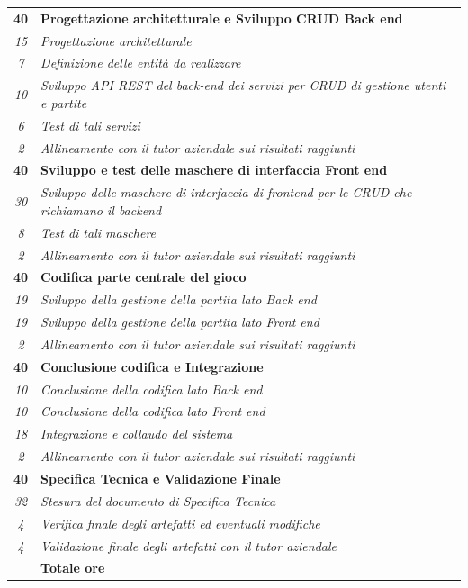 \begin{longtable}{|c|p{}|}
    \textbf{40} & \textbf{Progettazione architetturale e Sviluppo CRUD Back end} \\ \hdashline 
    \textit{15} & 
    \textit{Progettazione architetturale} \\
    \textit{7} & 
    \textit{Definizione delle entità da realizzare} \\
    \textit{10} & 
    \textit{Sviluppo API REST del back-end dei servizi per CRUD di gestione utenti e partite} \\
    \textit{6} & 
    \textit{Test di tali servizi} \\
    \textit{2} & 
    \textit{Allineamento con il tutor aziendale sui risultati raggiunti} \\
    \hline

    \textbf{40} & \textbf{Sviluppo e test delle maschere di interfaccia Front end} \\ \hdashline 
    \textit{30} & 
    \textit{Sviluppo delle maschere di interfaccia di frontend per le CRUD che richiamano il backend} \\
    \textit{8} & 
    \textit{Test di tali maschere} \\
    \textit{2} & 
    \textit{Allineamento con il tutor aziendale sui risultati raggiunti} \\
    \hline

    \textbf{40} & \textbf{Codifica parte centrale del gioco} \\ \hdashline 
    \textit{19} & 
    \textit{Sviluppo della gestione della partita lato Back end} \\
    \textit{19} & 
    \textit{Sviluppo della gestione della partita lato Front end} \\
    \textit{2} & 
    \textit{Allineamento con il tutor aziendale sui risultati raggiunti} \\
    \hline
    
    \pagebreak
    \textbf{40} & \textbf{Conclusione codifica e Integrazione}  \\ \hdashline 
    \textit{10} & 
    \textit{Conclusione della codifica lato Back end} \\
    \textit{10} & 
    \textit{Conclusione della codifica lato Front end} \\
    \textit{18} & 
    \textit{Integrazione e collaudo del sistema} \\
    \textit{2} & 
    \textit{Allineamento con il tutor aziendale sui risultati raggiunti} \\
    \hline

    \textbf{40} & \textbf{Specifica Tecnica e Validazione Finale}  \\ \hdashline
    \textit{32} &
    \textit{Stesura del documento di Specifica Tecnica} \\
    \textit{4} &
    \textit{Verifica finale degli artefatti ed eventuali modifiche} \\
    \textit{4} &
    \textit{Validazione finale degli artefatti con il tutor aziendale} \\
    \hline
	
	\textbf{\totaleOre} & \textbf{Totale ore} \\\hline
	
	
\end{longtable}